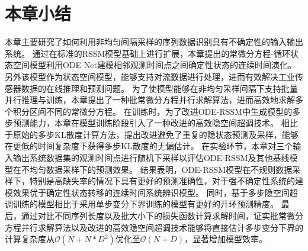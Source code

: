 



\section{本章小结}
\label{sec:5_conclusion}
本章主要研究了如何利用非均匀间隔采样的序列数据识别具有不确定性的输入输出系统。
通过在标准的RSSM模型基础上进行扩展，本章提出的常微分方程-循环状态空间模型利用ODE-Net建模相邻观测时间点之间确定性状态的连续时间演化。
另外该模型作为状态空间模型，能够支持对流数据进行处理，进而有效解决工业传感器数据的在线推理和预测问题。
为了使模型能够在非均匀采样间隔下支持批量并行推理与训练，本章提出了一种批常微分方程并行求解算法，进而高效地求解多个积分区间不同的常微分方程。
在训练时，为了改进ODE-RSSM中生成模型的多步预测能力，本章在模型训练阶段引入了一种改进的高效隐空间超调技术。
相比于原始的多步KL散度计算方法，提出改进避免了重复的隐状态预测及采样，能够在更低的时间复杂度下获得多步KL散度的无偏估计。
在实验环节，本章对三个输入输出系统数据集的观测时间点进行随机下采样以评估ODE-RSSM及其他基线模型在不均匀数据采样下的预测效果。
结果表明，ODE-RSSM模型在不规则数据采样下，特别是高缺失率的情况下具有更好的预测准确性，对于强不确定性系统的建模效果优于确定性状态转移的连续时间系统辨识模型。
同时，基于多步隐空间超调训练的模型相比于采用单步变分下界训练的模型有更好的开环预测精度。
最后，通过对比不同序列长度以及批大小下的损失函数计算求解时间，证实批常微分方程并行求解算法以及改进的高效隐空间超调技术能够将直接估计多步变分下界的计算复杂度从$\mathcal{O}(N+N*D^2)$优化至$\mathcal{O}(N+D)$，显著增加模型效率。
